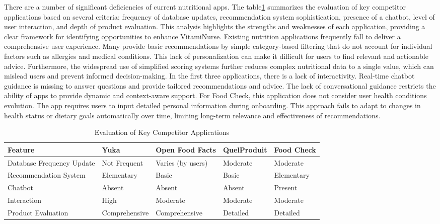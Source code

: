 There are a number of significant deficiencies of current nutritional apps.
The table\ref{tab:competitor_evaluation} summarizes the evaluation of key competitor applications
based on several criteria: frequency of database updates, recommendation
system sophistication, presence of a chatbot, level of user interaction,
and depth of product evaluation. This analysis highlights the strengths
and weaknesses of each application, providing a clear framework for
identifying opportunities to enhance VitamiNurse. Existing nutrition
applications frequently fall to deliver a comprehensive user experience.
Many provide basic recommendations by simple category-based filtering
that do not account for individual factors such as allergies and medical
conditions. This lack of personalization can make it difficult for users
to find relevant and actionable advice. Furthermore, the widespread
use of simplified scoring systems further reduces complex nutritional
data to a single value, which can mislead users and prevent informed
decision-making.
In the first three applications, there is a lack of interactivity. Real-time
chatbot guidance is missing to answer questions and provide tailored recommendations and advice. The lack of conversational guidance restricts
the ability of apps to provide dynamic and context-aware support.
For Food Check, this application does not consider user health conditions
evolution. The app requires users to input detailed personal information
during onboarding. This approach fails to adapt to changes in health status or dietary goals automatically over time, limiting long-term relevance
and effectiveness of recommendations.

\begin{table}[htbp]
\centering
\small %
\caption{Evaluation of Key Competitor Applications}
\label{tab:competitor_evaluation}
\begin{tabularx}{1.15\textwidth}{|l|X|X|X|X|}
\hline
\textbf{Feature} & \textbf{Yuka} & \textbf{Open Food Facts} & \textbf{QuelProduit} & \textbf{Food Check} \\
\hline
Database Frequency Update & Not Frequent & Varies (by users) & Moderate & Moderate \\
\hline
Recommendation System & Elementary & Basic & Basic & Elementary \\
\hline
Chatbot & Absent & Absent & Absent & Present \\
\hline
Interaction & High & Moderate & Moderate & Moderate \\
\hline
Product Evaluation & Comprehensive & Comprehensive & Detailed & Detailed \\
\hline
\end{tabularx}
\end{table}



